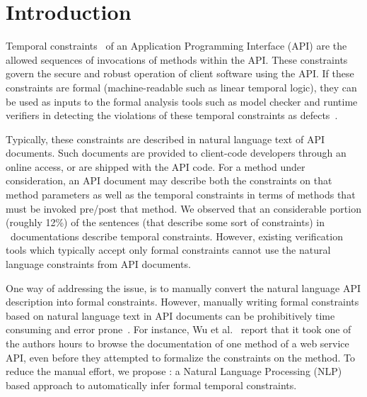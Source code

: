 \section{Introduction}
\label{sec:introduction}


Temporal constraints~\cite{ball2002s} of an Application Programming Interface (API) 
are the allowed sequences of invocations of methods within the API. 
These constraints govern the secure and robust operation of client software using the API.
If these constraints are formal (machine-readable such as linear temporal logic),
they can be used as inputs to the formal analysis tools such 
as model checker and runtime verifiers
in detecting the violations of these temporal constraints as defects~\cite{lee2012towards}.

Typically, these constraints are described in natural language text of API documents.
Such documents are provided to client-code developers through an online access, or are shipped with the API code.
For a method under consideration, an API document may describe both the constraints on that method parameters
as well as the temporal constraints in terms of methods that must be invoked pre/post that method.
We observed that an considerable portion (roughly 12\%) of the sentences (that describe some sort of constraints)
in \amazonAPI\ documentations describe temporal constraints.
However, existing verification tools which typically accept only formal constraints
cannot use the natural language constraints from API documents.

One way of addressing the issue, is to manually convert the natural language API description into formal constraints. 
However, manually writing formal constraints based on natural language text in API documents can be prohibitively time consuming and error prone~\cite{wu2013inferring,RubingerWEB10}. 
For instance, Wu et al.~\cite{wu2013inferring} report that it took one of the authors hours to browse the documentation of one method of a web service API, even before they attempted to formalize the constraints on the method.
To reduce the manual effort, we propose \tool: a Natural Language Processing (NLP) based approach
to automatically infer formal temporal constraints. 


